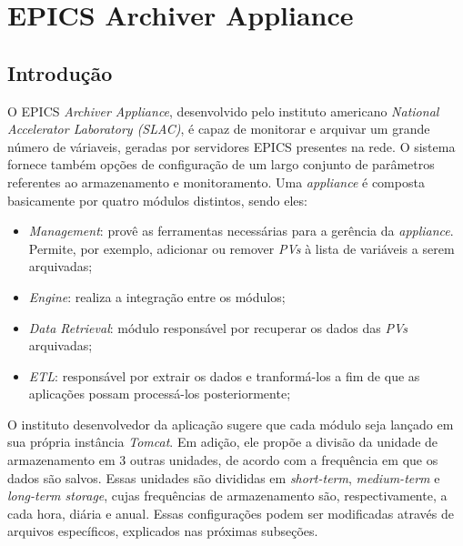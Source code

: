 \section {EPICS Archiver Appliance}
\label{sec:archiver}
\subsection {Introdução}

O EPICS \textit{Archiver Appliance}, desenvolvido pelo instituto americano
\textit{National Accelerator Laboratory (SLAC)}, é capaz de monitorar e arquivar
um grande número de váriaveis, geradas por servidores
EPICS presentes na rede. O sistema fornece também opções de configuração de um
largo conjunto de parâmetros referentes ao armazenamento e monitoramento. Uma
\textit{appliance} é composta basicamente por quatro módulos distintos, sendo eles:

\begin{itemize}
  \renewcommand\labelitemi{--}
  \item \textit{Management}: provê as ferramentas necessárias para a gerência
  da \textit{appliance}. Permite, por exemplo, adicionar ou remover \textit{PVs}
  à lista de variáveis a serem arquivadas;
  \item \textit{Engine}: realiza a integração entre os módulos;
  \item \textit{Data Retrieval}: módulo responsável por recuperar os dados das
  \textit{PVs} arquivadas;
  \item \textit{ETL}: responsável por extrair os dados e tranformá-los a fim de
  que as aplicações possam processá-los posteriormente;
\end{itemize}

% 
%     

O instituto desenvolvedor da aplicação sugere que cada módulo seja lançado em
sua própria instância \textit{Tomcat}. Em adição, ele propõe a divisão da
unidade de armazenamento em 3 outras unidades, de acordo com a frequência em que
os dados são salvos. Essas unidades são divididas em \textit{short-term},
\textit{medium-term} e \textit{long-term storage}, cujas frequências de
armazenamento são, respectivamente, a cada hora, diária e anual. Essas
configurações podem ser modificadas através de arquivos
específicos, explicados nas próximas subseções.

